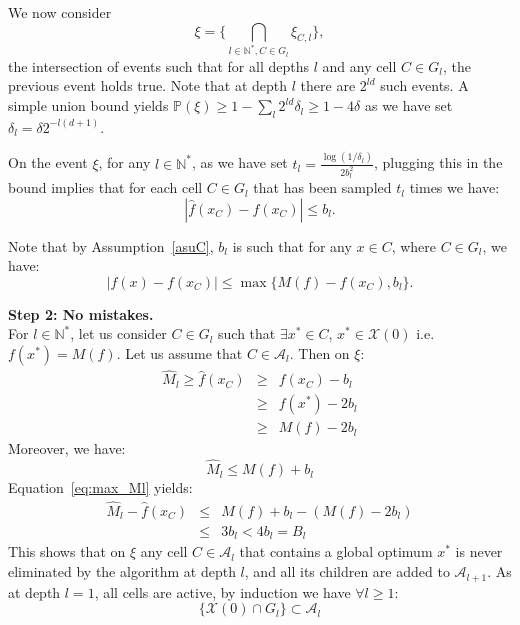 \documentclass[final,12pt]{colt2018}
\begin{document}
We now consider 
$$\xi = \Big\{\bigcap_{l\in \mathbb N^*, C \in G_l} \xi_{C,l}\Big\},$$
the intersection of events such that for all depths $l$ and any cell $C\in G_l$, the previous event holds true. Note that at depth $l$ there are $2^{ld}$ such events. A simple union bound yields $\mathbb{P}(\xi) \geq 1 - \sum_l 2^{ld}\delta_{l} \geq  1 - 4\delta$ as we have set $\delta_{l} = \delta 2^{-l(d+1)}$.

On the event $\xi$, for any $l \in \mathbb N^*$, as we have set $t_l = \frac{\log(1/\delta_l)}{2b_{l}^2}$, plugging this in the bound implies that for each cell $C \in G_l$ that has been sampled $t_l$ times we have: 
\begin{equation}\label{eq:xi}
|\widehat{f}(x_C) - f(x_C)| \leq b_{l}.
\end{equation}

Note that by Assumption~\ref{asuC}, $b_l$ is such that for any $x \in C$, where $C\in G_l$, we have:
\begin{equation}\label{eq:b_l}
|f(x)- f(x_C)| \leq \max\{M(f) - f(x_C), b_l\}.
\end{equation}

\textbf{Step 2: No mistakes.}\\
For $l \in \mathbb N^*$, let us consider $C \in G_l$ such that $\exists x^* \in C$, $x^* \in \mathcal X(0)$ i.e. $f(x^*) = M(f)$. Let us assume that $C \in \mathcal{A}_l$. Then on $\xi$:
\begin{eqnarray}\label{eq:min_Ml}
\widehat{M}_l \geq \widehat{f}(x_C) & \geq & f(x_C) - b_l \nonumber \\ 
& \geq & f(x^*) - 2b_l \nonumber \\
& \geq & M(f) - 2 b_l
\end{eqnarray}
Moreover, we have:
\begin{equation}\label{eq:max_Ml}
\widehat{M}_l \leq M(f)+b_l
\end{equation}
Equation~\eqref{eq:max_Ml} yields:
\begin{eqnarray*}
\widehat{M}_l - \widehat{f}(x_C) & \leq &  M(f) + b_l - (M(f) - 2 b_l) \\
& \leq & 3 b_l < 4 b_l = B_l
\end{eqnarray*}
This shows that on $\xi$ any cell $C \in \mathcal{A}_l$ that contains a global optimum $x^*$ is never eliminated by the algorithm at depth $l$, and all its children are added to $\mathcal{A}_{l+1}$. As at depth $l=1$, all cells are active, 
by induction we have $\forall l \geq 1$:
\begin{equation}\label{eq:active_opt}
\{\mathcal X(0) \cap G_l\} \subset \mathcal{A}_l
\end{equation}
\end{document}
